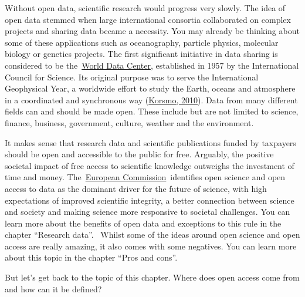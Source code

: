 \documentclass[
]{book}
\begin{document}
Without open data, scientific research would progress very slowly. The idea of open data stemmed when large international consortia collaborated on complex projects and sharing data became a necessity. You may already be thinking about some of these applications such as oceanography, particle physics, molecular biology or genetics projects. The first significant initiative in data sharing is considered to be the~\href{http://wdc.org.ua/}{}\href{http://wdc.org.ua/}{World Data Center}, established in 1957 by the International Council for Science. Its original purpose was to serve the International Geophysical Year, a worldwide effort to study the Earth, oceans and atmosphere in a coordinated and synchronous way (\href{https://www.researchgate.net/publication/270166513_The_Origins_and_Principles_of_the_World_Data_Center_System}{Korsmo, 2010}). Data from many different fields can and should be made open. These include but are not limited to science, finance, business, government, culture, weather and the environment.

It makes sense that research data and scientific publications funded by taxpayers should be open and accessible to the public for free. Arguably, the positive societal impact of free access to scientific knowledge outweighs the investment of time and money. The~\href{https://ec.europa.eu/info/research-and-innovation/strategy/strategy-2020-2024/our-digital-future/open-science_en}{}\href{https://ec.europa.eu/info/research-and-innovation/strategy/strategy-2020-2024/our-digital-future/open-science_en}{European Commission}~identifies open science and open access to data as the dominant driver for the future of science, with high expectations of improved scientific integrity, a better connection between science and society and making science more responsive to societal challenges. You can learn more about the benefits of open data and exceptions to this rule in the chapter ``Research data''. ~Whilst some of the ideas around open science and open access are really amazing, it also comes with some negatives. You can learn more about this topic in the chapter ``Pros and cons''.

But let's get back to the topic of this chapter. Where does open access come from and how can it be defined?
\end{document}
